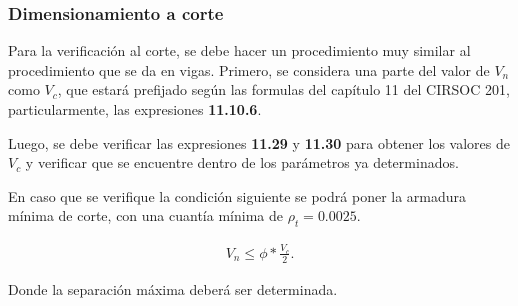 \documentclass[../main.tex]{subfiles}
\begin{document}
\subsubsection{Dimensionamiento a corte}

Para la verificación al corte, se debe hacer un procedimiento muy similar al
procedimiento que se da en vigas. Primero, se considera una parte del valor
de $V_n$ como  $V_c$, que estará prefijado según las formulas del capítulo 11
del CIRSOC 201, particularmente, las expresiones \textbf{11.10.6}.

Luego, se debe verificar las expresiones  \textbf{11.29} y \textbf{11.30} para
obtener los valores de $V_c$ y verificar que se encuentre dentro de los
parámetros ya determinados.

En caso que se verifique la condición siguiente se podrá poner la armadura
mínima de corte, con una cuantía mínima de $\rho_t = 0.0025$.

 \begin{align*}
  V_n \leq  \phi * \frac{V_c}{2}
.\end{align*}


Donde la separación máxima deberá ser determinada.
\end{document}
